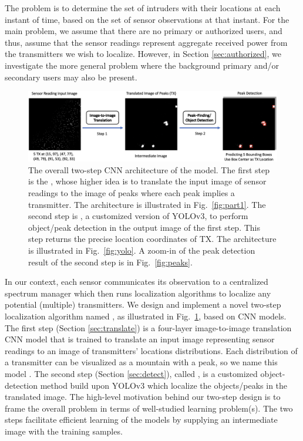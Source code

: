 The \mtl problem is to determine the set of intruders with their
locations at each instant of time, based on the set of sensor
observations at that instant. 
For the main 
\mtl problem, we assume that there are no primary or authorized users, and thus, assume that the
sensor readings represent aggregate received power from the transmitters we
wish to localize.
However, in Section \ref{sec:authorized}, we investigate the more general \mtl problem where the background primary and/or secondary users may also be present.

\begin{figure}
    \centering
    \includegraphics[width=\textwidth]{chapters/wowmom-pmc/figures/two-step-idea.png}
    \caption{The overall two-step CNN architecture of the \our model. The first step is the \imgimg, whose higher idea is to translate the input image of sensor readings to the image of peaks where each peak implies a transmitter. The \imgimg architecture is illustrated in Fig.~\ref{fig:part1}. The second step is \yolocust, a customized version of YOLOv3, to perform object/peak detection in the output image of the first step. This step returns the precise location coordinates of TX. The \yolocust architecture is illustrated in Fig.~\ref{fig:yolo}. A zoom-in of the peak detection result of the second step is in Fig.~\ref{fig:peaks}.}
    \label{fig:overall}
\end{figure}

In our context, each sensor communicates its observation to a centralized spectrum 
manager which then runs localization algorithms to localize any potential (multiple) transmitters. 
We design and implement a novel two-step localization algorithm named \our, as illustrated in Fig.~\ref{fig:overall}, based on CNN models. 
The first step (Section \ref{sec:translate}) is a four-layer image-to-image translation CNN model that is trained
to translate an input image representing sensor readings to an image of 
transmitters' locations distributions. Each distribution of a transmitter can be visualized as a mountain with a peak, so we name this model \imgimg.
The second step (Section \ref{sec:detect}), called \yolocust, is a customized object-detection method build upon YOLOv3\cite{yolov3} which localize the objects/peaks in the translated image.
The high-level motivation behind our two-step design is to frame the overall \mtl
problem in terms of well-studied learning problem(s). 
The two steps facilitate efficient learning of the models by supplying an intermediate image with the training samples. 
